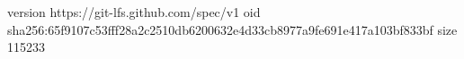 version https://git-lfs.github.com/spec/v1
oid sha256:65f9107c53fff28a2c2510db6200632e4d33cb8977a9fe691e417a103bf833bf
size 115233
